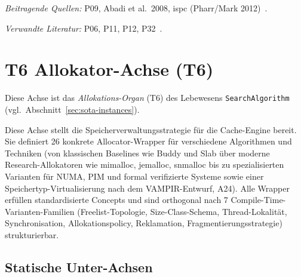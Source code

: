 \begin{scriptsize}
\begin{longtable}{@{}>{\raggedright\arraybackslash}p{3.0cm} >{\raggedright\arraybackslash}p{7.0cm} >{\raggedright\arraybackslash}p{3.5cm}@{}}
\bottomrule
\end{longtable}
\end{scriptsize}

\emph{Beitragende Quellen:} P09, Abadi et al.\ 2008, ispc (Pharr/\allowbreak{}Mark 2012)~\cite{jacobson1989louds,abadi2008columnrow,pharr2012ispc}.

\emph{Verwandte Literatur:} P06, P11, P12, P32~\cite{schmeisser2022b2tree,rao1999css,rao2000csb,schmidt2025hbm}.

\section{T6 Allokator-Achse (T6)}

Diese Achse ist das \emph{Allokations-Organ} (T6) des Lebewesens \texttt{SearchAlgorithm} (vgl.\ Abschnitt~\ref{sec:sota-instances}).

Diese Achse stellt die Speicherverwaltungsstrategie für die Cache-Engine bereit. Sie definiert 26 konkrete Allocator-Wrapper für verschiedene Algorithmen und Techniken (von klassischen Baselines wie Buddy und Slab über moderne Research-Allokatoren wie mimalloc, jemalloc, snmalloc bis zu spezialisierten Varianten für NUMA, PIM und formal verifizierte Systeme sowie einer Speichertyp-Virtualisierung nach dem VAMPIR-Entwurf, A24). Alle Wrapper erfüllen standardisierte Concepts und sind orthogonal nach 7 Compile-Time-Varianten-Familien (Freelist-Topologie, Size-Class-Schema, Thread-Lokalität, Synchronisation, Allokationspolicy, Reklamation, Fragmentierungsstrategie) strukturierbar.

\subsection*{Statische Unter-Achsen}

